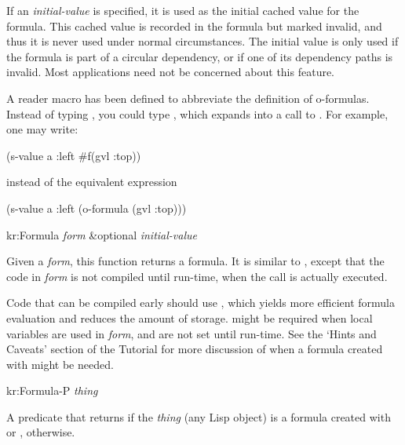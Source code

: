 If an {\it initial-value} is specified, it
is used as the initial cached value for the formula.
This cached value is recorded in the formula but marked invalid, and thus
it is never used under normal circumstances.  The initial value is only
used if the formula is part of a circular dependency, or if one of its
dependency paths is invalid.  Most applications need not be concerned about
this feature.

A reader macro has been defined to abbreviate the definition of o-formulas.
Instead of typing , you could type , which
expands into a call to .  For example, one may write:
\begin{programexample}
   (s-value a :left \#f(gvl :top))
\end{programexample}
instead of the equivalent expression
\begin{programexample}
   (s-value a :left (o-formula (gvl :top)))
\end{programexample}

\value{f-top}
\begin{example}
kr:Formula {\it form} \&optional {\it initial-value}\value{function}
\end{example}

Given a {\it form}, this function returns a formula.  It is similar to
, except that the code in {\it form} is not compiled until
run-time, when the  call is actually executed.

Code that can be compiled early should use , which
yields more efficient formula evaluation and reduces the amount of storage.
 might be required when local variables are used in {\it form},
and are not set until run-time.  See the `Hints and Caveats' section of
the Tutorial for more discussion of when a
formula created with  might be needed.


\value{f-top}
\begin{example}
kr:Formula-P {\it thing}\value{macro}
\end{example}

A predicate that returns \value{T} if the {\it thing} (any Lisp object) is a
formula created with  or , \value{NIL} otherwise.


